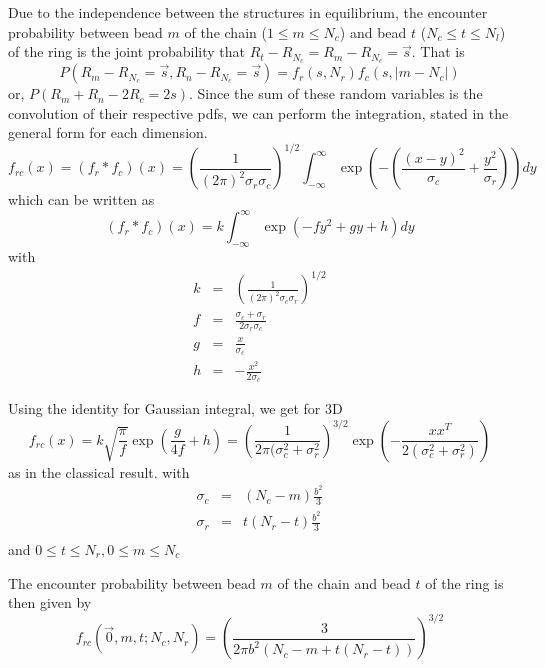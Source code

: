 \documentclass{report}
\begin{document}
Due to the independence between the structures in equilibrium, the encounter probability between bead $m$ of the chain ($1\leq m \leq N_c$) and bead $t$ ($N_c\leq t \leq N_l$) of the ring is the joint probability that $R_t-R_{N_c}= R_m-R_{N_c}=\vec{s}$. That is 
\begin{equation*}
P(R_m-R_{N_c}=\vec{s}, R_n-R_{N_c}=\vec{s})=f_r(s,N_r)f_c(s,|m-N_c|)
\end{equation*}
or, $P(R_m+R_n-2R_c=2s)$. Since the sum of these random variables is the convolution of their respective pdfs, we can perform the integration, stated in the general form for each dimension.
\begin{equation*}
f_{rc}(x)=\left(f_r*f_c\right)(x)=\left(\frac{1}{(2\pi)^2 \sigma_r\sigma_c} \right)^{1/2}\int_{-\infty}^{\infty}\exp\left(- \left(\frac{(x-y)^2}{\sigma_c}+\frac{y^2}{\sigma_r}\right)\right)dy
\end{equation*}
which can be written as
\begin{equation*}
\left(f_r*f_c\right)(x)=k\int_{-\infty}^{\infty}\exp(-fy^2+gy+h)dy
\end{equation*}
with 
\begin{eqnarray*}
k &=& \left(\frac{1}{(2\pi)^2 \sigma_c\sigma_r}\right)^{1/2}\\
f &=& \frac{\sigma_c+\sigma_r}{2\sigma_r\sigma_c}\\
g &=& \frac{x}{\sigma_c}\\
h &=& -\frac{x^2}{2\sigma_c}
\end{eqnarray*}

Using the identity for Gaussian integral, we get for 3D
\begin{equation*}
f_{rc}(x) = k\sqrt{\frac{\pi}{f}}\exp(\frac{g}{4f}+h)=\left(\frac{1}{2\pi(\sigma_c^2 +\sigma_r^2}\right)^{3/2}\exp\left(-\frac{xx^T}{2(\sigma_c^2+\sigma_r^2)}\right)
\end{equation*}
as in the classical result. with 
\begin{eqnarray*}
\sigma_c &=& (N_c-m)\frac{b^2}{3}\\
\sigma_r &=& t(N_r-t)\frac{b^2}{3}\\
\end{eqnarray*}
and $0 \leq t\leq N_r, 0\leq m\leq N_c$

The encounter probability between bead $m$ of the chain and bead $t$ of the ring is then given by 
\begin{equation*}
f_{rc}(\vec{0},m,t;N_c,N_r)=\left(\frac{3}{2\pi b^2(N_c-m+t(N_r-t))}\right)^{3/2}
\end{equation*}
\end{document}
